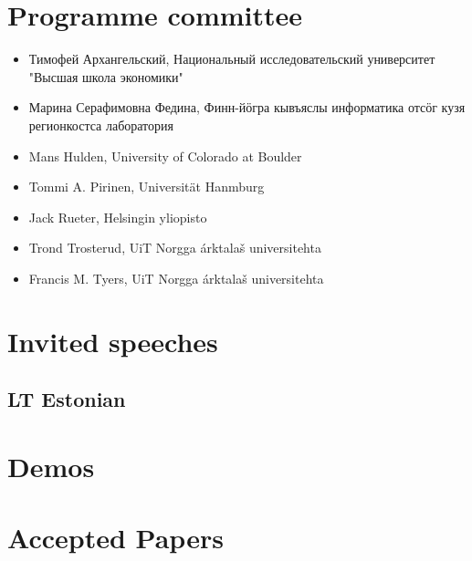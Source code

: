 \documentclass[b5paper]{book}
\newcommand\thedoi{doidoi}
\begin{document}
\renewcommand\thedoi{doidoi}

\chapter*{Programme committee}

\begin{itemize}
    \item Тимофей Архангельский, Национальный исследовательский университет "Высшая школа экономики"
    \item Марина Серафимовна Федина, Финн-йӧгра кывъяслы информатика отсӧг кузя регионкостса лаборатория
    \item Mans Hulden, University of Colorado at Boulder
    \item Tommi A. Pirinen, Universität Hanmburg
    \item Jack Rueter, Helsingin yliopisto
    \item Trond Trosterud, UiT Norgga árktalaš universitehta
    \item Francis M. Tyers, UiT Norgga árktalaš universitehta
\end{itemize}

\tableofcontents

\mainmatter

\chapter{Invited speeches}
\section{LT Estonian}

\renewcommand\thedoi{doidoi}


\chapter{Demos}

\renewcommand\thedoi{doidoi}


\chapter{Accepted Papers}
\end{document}
